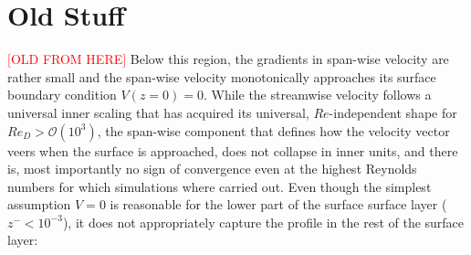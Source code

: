 \documentclass[a4paper,11pt]{amsart}
\newcommand{\todo}[1]{\textcolor{red}{$[$#1$]$}}
\begin{document}
\printbibliography 

\appendix
\section{Old Stuff}
\todo{OLD FROM HERE} 
Below this region, the gradients in span-wise velocity are rather small and the span-wise velocity
monotonically approaches its surface boundary condition $V(z=0)=0$.
%
While the streamwise velocity follows a universal inner scaling that has acquired its universal, $Re$-independent shape for $Re_D> \mathcal{O}\left(10^3\right)$, the span-wise component that defines how the velocity vector veers when the surface is approached,
does not collapse in inner units, and there is, most importantly no sign of convergence even at the highest Reynolds numbers for
which simulations where carried out.
%
Even though the simplest assumption $V=0$ is reasonable for the lower part of the surface surface layer ($z^-<10^{-3}$), it does
not appropriately capture the profile in the rest of the surface layer:
\end{document}
